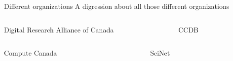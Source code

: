 \documentclass[
  10pt,
  ignorenonframetext,
  aspectratio=169,handout]{beamer}
\begin{document}
\begin{frame}{Different organizations}
\label{different-organizations}
A digression about all those different organizations

\begin{columns}[T]
\begin{column}{0.47\linewidth}\setlength{\parskip}{0.5\baselineskip}
\begin{block}{Digital Research Alliance of Canada}\setlength{\parskip}{0.5\baselineskip}
\label{digital-research-alliance-of-canada}
\end{block}
\end{column}

\begin{column}{0.47\linewidth}\setlength{\parskip}{0.5\baselineskip}
\begin{block}{CCDB}\setlength{\parskip}{0.5\baselineskip}
\label{ccdb}
\end{block}
\end{column}
\end{columns}

\begin{columns}[T]
\begin{column}{0.47\linewidth}\setlength{\parskip}{0.5\baselineskip}
\begin{block}{Compute Canada}\setlength{\parskip}{0.5\baselineskip}
\label{compute-canada}
\end{block}
\end{column}

\begin{column}{0.47\linewidth}\setlength{\parskip}{0.5\baselineskip}
\begin{block}{SciNet}\setlength{\parskip}{0.5\baselineskip}
\label{scinet}
\end{block}
\end{column}
\end{columns}
\end{frame}
\end{document}
